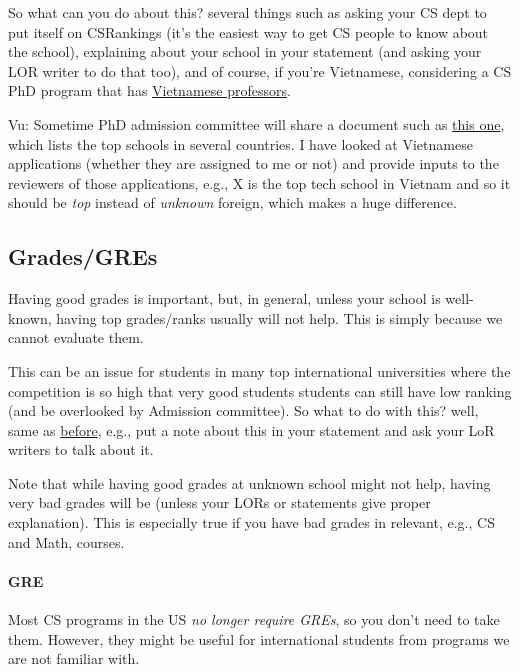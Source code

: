 \documentclass[11pt]{article}
\newcommand{\red}[1]{{\color{red}{#1}}}
\begin{document}
So what can you do about this? several things such as asking your CS dept to put itself on CSRankings (it's the easiest way to get CS people to know about the school), explaining about your school in your statement (and asking your LOR writer to do that too), and of course, if you're Vietnamese, considering a CS PhD program that has \href{https://github.com/dynaroars/dynaroars.github.io/wiki/Viet-CS-Profs-US}{Vietnamese professors}.

\begin{tcolorbox}[left=1pt,right=1pt,top=1pt,bottom=1pt]
Vu: Sometime PhD admission committee will share a document such as \href{https://github.com/dynaroars/dynaroars.github.io/wiki/Foreign-Top-Schools}{this one}, which lists the top schools in several countries. I have looked at Vietnamese applications (whether they are assigned to me or not) and provide inputs to the reviewers of those applications, e.g., X is the top tech school in Vietnam and so it should be \emph{top} instead of \emph{unknown} foreign, which makes a huge difference.
\end{tcolorbox}

\subsection{Grades/GREs}\label{sec:grades}
Having good grades is important, but, in general, unless your school is well-known, having top grades/ranks
usually will not help. This is simply because we cannot evaluate them.

This can be an issue for students in many top international universities where the competition is so high that very good students students can still have low ranking (and be overlooked by Admission committee).
So what to do with this? well, same as \hyperref[sec:your-school]{before}, e.g., put a note about this in your statement and ask your LoR writers to talk about it.

Note that while having good grades at unknown school might not help,
having very bad grades will be \red{red flag} (unless your LORs or
statements give proper explanation). This is especially true if you
have bad grades in relevant, e.g., CS and Math, courses.

\paragraph{GRE} Most CS programs in the US \emph{no longer require GREs}, so you don't need to
take them. However, they might be useful for international students from programs we are not familiar with. 
\end{document}
